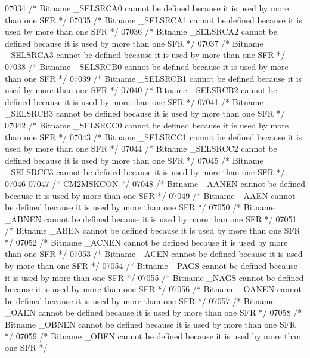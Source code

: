 \begin{DoxyCode}
07034 \textcolor{comment}{/* Bitname \_SELSRCA0 cannot be defined because it is used by more than one SFR */}
07035 \textcolor{comment}{/* Bitname \_SELSRCA1 cannot be defined because it is used by more than one SFR */}
07036 \textcolor{comment}{/* Bitname \_SELSRCA2 cannot be defined because it is used by more than one SFR */}
07037 \textcolor{comment}{/* Bitname \_SELSRCA3 cannot be defined because it is used by more than one SFR */}
07038 \textcolor{comment}{/* Bitname \_SELSRCB0 cannot be defined because it is used by more than one SFR */}
07039 \textcolor{comment}{/* Bitname \_SELSRCB1 cannot be defined because it is used by more than one SFR */}
07040 \textcolor{comment}{/* Bitname \_SELSRCB2 cannot be defined because it is used by more than one SFR */}
07041 \textcolor{comment}{/* Bitname \_SELSRCB3 cannot be defined because it is used by more than one SFR */}
07042 \textcolor{comment}{/* Bitname \_SELSRCC0 cannot be defined because it is used by more than one SFR */}
07043 \textcolor{comment}{/* Bitname \_SELSRCC1 cannot be defined because it is used by more than one SFR */}
07044 \textcolor{comment}{/* Bitname \_SELSRCC2 cannot be defined because it is used by more than one SFR */}
07045 \textcolor{comment}{/* Bitname \_SELSRCC3 cannot be defined because it is used by more than one SFR */}
07046 
07047 \textcolor{comment}{/* CM2MSKCON */}
07048 \textcolor{comment}{/* Bitname \_AANEN cannot be defined because it is used by more than one SFR */}
07049 \textcolor{comment}{/* Bitname \_AAEN cannot be defined because it is used by more than one SFR */}
07050 \textcolor{comment}{/* Bitname \_ABNEN cannot be defined because it is used by more than one SFR */}
07051 \textcolor{comment}{/* Bitname \_ABEN cannot be defined because it is used by more than one SFR */}
07052 \textcolor{comment}{/* Bitname \_ACNEN cannot be defined because it is used by more than one SFR */}
07053 \textcolor{comment}{/* Bitname \_ACEN cannot be defined because it is used by more than one SFR */}
07054 \textcolor{comment}{/* Bitname \_PAGS cannot be defined because it is used by more than one SFR */}
07055 \textcolor{comment}{/* Bitname \_NAGS cannot be defined because it is used by more than one SFR */}
07056 \textcolor{comment}{/* Bitname \_OANEN cannot be defined because it is used by more than one SFR */}
07057 \textcolor{comment}{/* Bitname \_OAEN cannot be defined because it is used by more than one SFR */}
07058 \textcolor{comment}{/* Bitname \_OBNEN cannot be defined because it is used by more than one SFR */}
07059 \textcolor{comment}{/* Bitname \_OBEN cannot be defined because it is used by more than one SFR */}

\end{DoxyCode}
